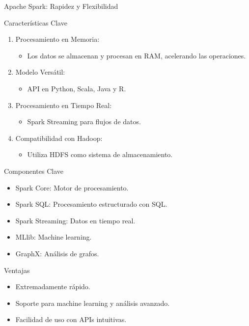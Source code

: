 \documentclass[presentation]{beamer}
\begin{document}
\begin{frame}[label={sec:org516b06a}]{Apache Spark: Rapidez y Flexibilidad}
\begin{block}{Características Clave}
\begin{enumerate}
\item \alert{\alert{Procesamiento en Memoria:}}
\begin{itemize}
\item Los datos se almacenan y procesan en RAM, acelerando las operaciones.
\end{itemize}
\item \alert{\alert{Modelo Versátil:}}
\begin{itemize}
\item API en Python, Scala, Java y R.
\end{itemize}
\item \alert{\alert{Procesamiento en Tiempo Real:}}
\begin{itemize}
\item Spark Streaming para flujos de datos.
\end{itemize}
\item \alert{\alert{Compatibilidad con Hadoop:}}
\begin{itemize}
\item Utiliza HDFS como sistema de almacenamiento.
\end{itemize}
\end{enumerate}
\end{block}

\begin{block}{Componentes Clave}
\begin{itemize}
\item \alert{\alert{Spark Core:}} Motor de procesamiento.
\item \alert{\alert{Spark SQL:}} Procesamiento estructurado con SQL.
\item \alert{\alert{Spark Streaming:}} Datos en tiempo real.
\item \alert{\alert{MLlib:}} Machine learning.
\item \alert{\alert{GraphX:}} Análisis de grafos.
\end{itemize}
\end{block}

\begin{block}{Ventajas}
\begin{itemize}
\item Extremadamente rápido.
\item Soporte para machine learning y análisis avanzado.
\item Facilidad de uso con APIs intuitivas.
\end{itemize}
\end{block}


\end{frame}
\end{document}
